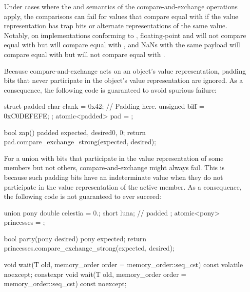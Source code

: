\begin{itemdescr}
\pnum
\begin{note}
Under cases where the  and  semantics of the compare-and-exchange
operations apply, the comparisons can fail for values that compare equal with
 if the value representation has trap bits or alternate
representations of the same value. Notably, on implementations conforming to
\IsoFloatUndated{}, floating-point  and 
will not compare equal with  but will compare equal with ,
and NaNs with the same payload will compare equal with  but will not
compare equal with .
\end{note}
\begin{note}
Because compare-and-exchange acts on an object's value representation,
padding bits that never participate in the object's value representation
are ignored. As a consequence, the following code is guaranteed to avoid
spurious failure:
\begin{codeblock}
struct padded {
  char clank = 0x42;
  // Padding here.
  unsigned biff = 0xC0DEFEFE;
};
atomic<padded> pad = {};

bool zap() {
  padded expected, desired{0, 0};
  return pad.compare_exchange_strong(expected, desired);
}
\end{codeblock}
\end{note}
\begin{note}
For a union with bits that participate in the value representation
of some members but not others, compare-and-exchange might always fail.
This is because such padding bits have an indeterminate value when they
do not participate in the value representation of the active member.
As a consequence, the following code is not guaranteed to ever succeed:
\begin{codeblock}
union pony {
  double celestia = 0.;
  short luna;       // padded
};
atomic<pony> princesses = {};

bool party(pony desired) {
  pony expected;
  return princesses.compare_exchange_strong(expected, desired);
}
\end{codeblock}
\end{note}
\end{itemdescr}

%
%
%
%
\begin{itemdecl}
void wait(T old, memory_order order = memory_order::seq_cst) const volatile noexcept;
constexpr void wait(T old, memory_order order = memory_order::seq_cst) const noexcept;
\end{itemdecl}

